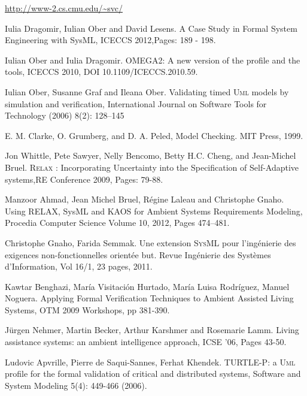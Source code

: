 \documentclass[a4paper,twoside]{article}
\def\myrelax{\textsc{Relax}}                  %
\def\sysml{\textsc{SysML}}
\def\UML{\textsc{Uml}}
\def\uml{\textsc{Uml}}
\newcommand{\final}[1]{#1}
\begin{document}
%

\begin{thebibliography}{1}

\url{http://www-2.cs.cmu.edu/~svc/}

\final{Iulia Dragomir, Iulian Ober and David Lesens. A Case Study in Formal System Engineering with SysML, ICECCS 2012,Pages: 189 - 198.}

 \final{Iulian Ober and Iulia Dragomir. OMEGA2: A new version of the profile and the tools, ICECCS 2010,
DOI 10.1109/ICECCS.2010.59.}

  \final{Iulian Ober, Susanne Graf and Ileana Ober. Validating timed \uml{} models by simulation and verification, International Journal on Software Tools for Technology (2006) 8(2): 128–145}

E. M. Clarke, O. Grumberg, and D. A. Peled, Model Checking. MIT Press, 1999.

 \final{Jon Whittle, Pete Sawyer, Nelly Bencomo, Betty H.C. Cheng, and Jean-Michel Bruel. \myrelax{} : Incorporating Uncertainty into the Speciﬁcation of Self-Adaptive systems,RE Conference 2009, Pages: 79-88.}

 \final{Manzoor Ahmad, Jean Michel Bruel, R\'egine Laleau and Christophe Gnaho. Using RELAX, SysML and KAOS for Ambient Systems Requirements Modeling, Procedia Computer Science Volume 10, 2012, Pages 474–481.}

 Christophe Gnaho, Farida Semmak. Une extension \sysml{} pour l'ing\'enierie des exigences non-fonctionnelles orient\'ee but. Revue Ing\'enierie des Syst\`emes d'Information, Vol 16/1, 23 pages, 2011.

 Kawtar Benghazi, Mar\'ia Visitaci\'on Hurtado, Mar\'ia Luisa Rodr\'iguez, Manuel Noguera. Applying Formal Verification Techniques to Ambient Assisted Living Systems, OTM 2009 Workshops, pp 381-390.

 J\"urgen Nehmer, Martin Becker, Arthur Karshmer and Rosemarie Lamm. Living assistance systems: an ambient intelligence approach, ICSE '06, Pages 43-50. 


 Ludovic Apvrille, Pierre de Saqui-Sannes, Ferhat Khendek. TURTLE-P: a \UML{} profile for the formal validation of critical and distributed systems, Software and System Modeling 5(4): 449-466 (2006).


\end{thebibliography}
\end{document}
